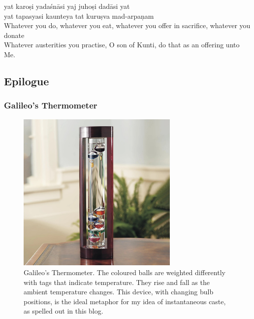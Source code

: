 \documentclass[
  a4paper,
]{article}
\begin{document}
yat karoṣi yadaśnāsi yaj juhoṣi dadāsi yat\\
yat tapasyasi kaunteya tat kuruṣva mad-arpaṇam\\

Whatever you do, whatever you eat, whatever you offer in sacrifice,
whatever you donate\\
Whatever austerities you practise, O son of Kunti, do that as an
offering unto Me.\\

\subsection{Epilogue}\label{epilogue}

\subsubsection{Galileo's Thermometer}\label{galileos-thermometer}

\begin{figure}
\centering
\includegraphics[width=0.7\textwidth,height=\textheight]{images/galileo-thermometer.jpg}
\caption[Galileo's Thermometer. The coloured balls are weighted
differently with tags that indicate temperature. They rise and fall as
the ambient temperature changes. This device, with changing bulb
positions, is the ideal metaphor for my idea of instantaneous caste, as
spelled out in this blog.]{Galileo's Thermometer. The coloured balls are
weighted differently with tags that indicate temperature. They rise and
fall as the ambient temperature changes. This device, with changing bulb
positions, is the ideal metaphor for my idea of instantaneous caste, as
spelled out in this blog.\footnotemark{}}\label{fig:galileo}
\end{figure}
\end{document}
